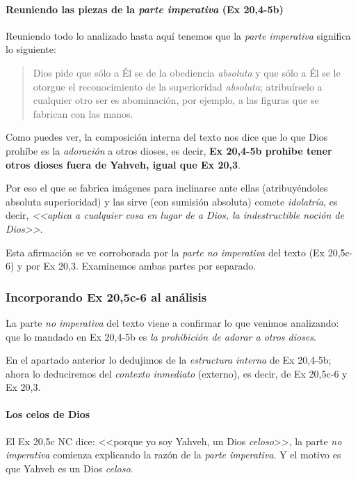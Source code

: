 \documentclass{article}
\begin{document}
\paragraph{Reuniendo las piezas de la \emph{parte imperativa} (Ex 20,4-5b)}

Reuniendo todo lo analizado hasta aqu\'{i} tenemos que la \emph{parte imperativa} significa lo siguiente:

\begin{quote}
Dios pide que s\'olo a \'El se de la obediencia \emph{absoluta} y que s\'olo a \'El se le otorgue el reconocimiento de la superioridad \emph{absoluta}; atribu\'{i}rselo a cualquier otro ser es abominaci\'on, por ejemplo, a las figuras que se fabrican con las manos. 
\end{quote}

\noindent
Como puedes ver, la composici\'on interna del texto nos dice que lo que Dios proh\'{i}be es la \emph{adoraci\'on} a otros dioses, es decir, \textbf{Ex 20,4-5b prohibe tener otros dioses fuera de Yahveh, igual que Ex 20,3}.

Por eso el que se fabrica im\'agenes para inclinarse ante ellas (atribuy\'endoles absoluta superioridad) y las sirve (con sumisi\'on absoluta) comete \emph{idolatr\'{i}a}, es decir, \emph{<<aplica a cualquier cosa en lugar de a Dios, la indestructible noci\'on de Dios>>}.

Esta afirmaci\'on se ve corroborada por la \emph{parte no imperativa} del texto (Ex 20,5c-6) y por Ex 20,3. Examinemos ambas partes por separado.

\subsubsection{Incorporando Ex 20,5c-6 al an\'alisis}

La parte \emph{no imperativa} del texto viene a confirmar lo que venimos analizando: que lo mandado en Ex 20,4-5b es \emph{la prohibici\'on de adorar a otros dioses}.

En el apartado anterior lo dedujimos de la \emph{estructura interna} de Ex 20,4-5b; ahora lo deduciremos del \emph{contexto inmediato} (externo), es decir, de Ex 20,5c-6 y Ex 20,3.

\paragraph{Los celos de Dios}

El Ex 20,5c NC dice: <<porque yo soy Yahveh, un Dios \emph{celoso}>>, la parte \emph{no imperativa} comienza explicando la raz\'on de la \emph{parte imperativa}. Y el motivo es que Yahveh es un Dios \emph{celoso}.
\end{document}
